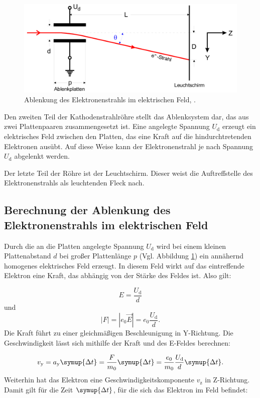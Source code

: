 \begin{figure}[h!]
	\centering
	\includegraphics[width=0.9\linewidth]{../../AblenkungEFeld}
	\caption{Ablenkung des Elektronenstrahls im elektrischen Feld, \cite[3]{anleitung501}.}
	\label{fig:ablenkungefeld}
\end{figure}

Den zweiten Teil der Kathodenstrahlröhre stellt das Ablenksystem dar, das aus zwei Plattenpaaren zusammengesetzt ist. Eine angelegte Spannung $U_{\text{d}}$ erzeugt ein elektrisches Feld zwischen den 
Platten, das eine Kraft auf die hindurchtretenden Elektronen ausübt. Auf diese Weise kann der Elektronenstrahl je nach Spannung $U_{\text{d}}$ abgelenkt werden.

Der letzte Teil der Röhre ist der Leuchtschirm. Dieser weist die Auftreffstelle des Elektronenstrahls als leuchtenden Fleck nach.

\subsection{Berechnung der Ablenkung des Elektronenstrahls im elektrischen Feld}
Durch die an die Platten angelegte Spannung $U_{\text{d}}$ wird bei einem kleinen Plattenabstand $d$ bei großer Plattenlänge $p$  (Vgl. Abbildung \ref{fig:ablenkungefeld})
ein annähernd homogenes elektrisches Feld erzeugt. In diesem Feld wirkt auf das eintreffende Elektron eine Kraft, das abhängig von der Stärke des Feldes ist. Also gilt:

\begin{equation}
E = \frac{U_{\text{d}}}{d}
\end{equation}
und
\begin{equation}
|{F}| = |{e_0 \vec{E}}| = e_0 \frac{U_{\text{d}}}{d}.
\end{equation}
Die Kraft führt zu einer gleichmäßigen Beschleunigung in Y-Richtung. Die Geschwindigkeit lässt sich mithilfe der Kraft und des E-Feldes berechnen:

\begin{equation}
v_{\text{y}} = a_{\text{y}} \symup{\Delta{t}} = \frac{F}{m_0} \symup{\Delta{t}} = \frac{e_0}{m_0} \frac{U_{\text{d}}}{d} \symup{\Delta{t}}.
\label{eqn:vy}
\end{equation}
Weiterhin hat das Elektron eine Geschwindigkeitskomponente $v_{\text{z}}$ in Z-Richtung. Damit gilt für die Zeit $\symup{\Delta{t}}$, für die sich das Elektron im Feld befindet:

